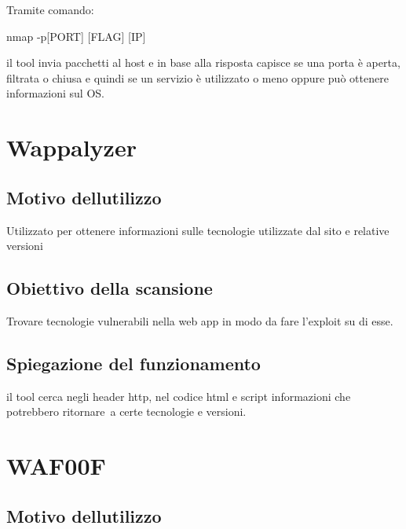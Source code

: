 \documentclass[
]{article}
\begin{document}
{Tramite comando:}

{nmap -p{[}PORT{]} {[}FLAG{]} {[}IP{]}}

{}

{il tool invia pacchetti al host e in base alla risposta capisce se una
porta è aperta, filtrata o chiusa e quindi se un servizio è utilizzato o
meno oppure può ottenere informazioni sul OS.}

{}

\section{\texorpdfstring{{Wappalyzer}}{Wappalyzer}}\label{h.boxe1ftvjrr}

\subsection{\texorpdfstring{{Motivo
dell\textquotesingle utilizzo}}{Motivo dell\textquotesingle utilizzo}}\label{h.dtueno752xs8}

{Utilizzato per ottenere informazioni sulle tecnologie utilizzate dal
sito e relative versioni}

\subsection{\texorpdfstring{{Obiettivo della
scansione}}{Obiettivo della scansione}}\label{h.6k40l5sirmys}

{Trovare tecnologie vulnerabili nella web app in modo da fare l'exploit
su di esse.}

\subsection{\texorpdfstring{{Spiegazione del
funzionamento}}{Spiegazione del funzionamento}}\label{h.dl2s5hs3ttbs}

{il tool cerca negli header http, nel codice html e script informazioni
che potrebbero }{ritornare}{~a certe tecnologie e versioni.}

{}

\section{\texorpdfstring{{WAF00F}}{WAF00F}}\label{h.ugp6xcvx77ev}

\subsection{\texorpdfstring{{Motivo
dell\textquotesingle utilizzo}}{Motivo dell\textquotesingle utilizzo}}\label{h.y5oaetewmvgs}
\end{document}
